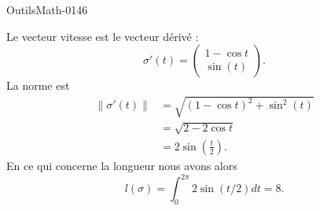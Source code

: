 
\begin{corrige}{OutilsMath-0146}

    Le vecteur vitesse est le vecteur dérivé :
    \begin{equation}
        \sigma'(t)=\begin{pmatrix}
            1-\cos t    \\ 
            \sin(t)    
        \end{pmatrix}.
    \end{equation}
    La norme est
    \begin{subequations}
        \begin{align}
            \| \sigma'(t) \|&= \sqrt{(1-\cos t)^2+\sin^2(t)}\\
            &=\sqrt{2-2\cos t}\\
            &=2\sin\left( \frac{ t }{2} \right).
        \end{align}
    \end{subequations}
    En ce qui concerne la longueur nous avons alors
    \begin{equation}
        l(\sigma)=\int_0^{2\pi}2\sin(t/2)dt=8.
    \end{equation}

\end{corrige}
